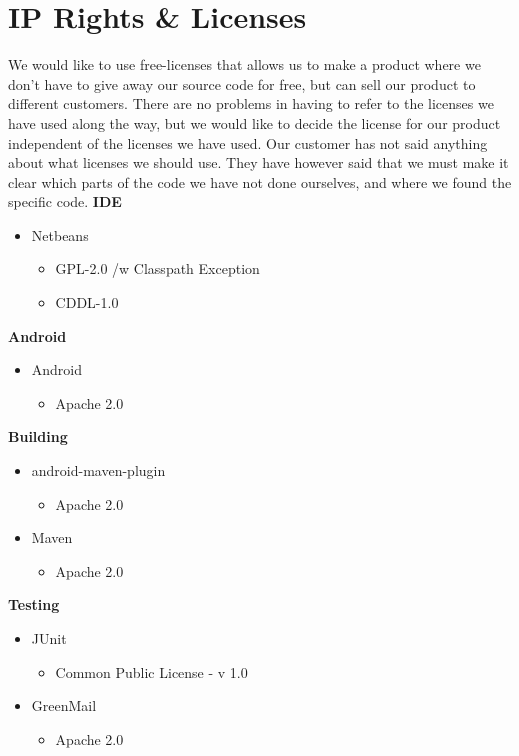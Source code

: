 
\section{IP Rights \& Licenses}
We would like to use free-licenses that allows us to make a product where we don’t have to give away our source code for free, but can sell our product to different customers. There are no problems in having to refer to the licenses we have used along the way, but we would like to decide the license for our product independent of the licenses we have used. 
\newline
\newline
Our customer has not said anything about what licenses we should use. They have however said that we must make it clear which parts of the code we have not done ourselves, and where we found the specific code.
	{\bf IDE}
		\begin{itemize}
			\item Netbeans
				\begin{itemize}
					\item GPL-2.0 /w Classpath Exception
					\item CDDL-1.0
				\end{itemize}
		\end{itemize}
	{\bf Android}
		\begin{itemize}
			\item Android
				\begin{itemize}
					\item Apache 2.0
				\end{itemize}
		\end{itemize}
	{\bf Building}
		\begin{itemize}
			\item android-maven-plugin
				\begin{itemize}
					\item Apache 2.0
				\end{itemize}
			\item Maven
				\begin{itemize}
					\item Apache 2.0
				\end{itemize}
		\end{itemize}
	{\bf Testing}
		\begin{itemize}
			\item JUnit
				\begin{itemize}
					\item Common Public License - v 1.0
				\end{itemize}
			\item GreenMail
				\begin{itemize}
					\item Apache 2.0
				\end{itemize}
		\end{itemize}
